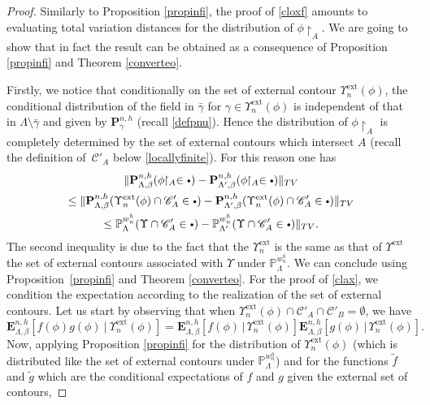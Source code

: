 \documentclass[10pt]{amsart}
\let\mathcal\mathscr
\newcommand{\sbullet}{{\scriptscriptstyle\bullet}}
\newcommand{\csbullet}{{\raisebox{1pt}{$\sbullet$}}}
\numberwithin{equation}{section}
\theoremstyle{plain}
\theoremstyle{definition}
\newcommand{\ext}{\mathrm{ext}}
\newcommand{\restrict}{\!\!\upharpoonright}
\newcommand{\cC}{{\ensuremath{\mathcal C}} }
\newcommand{\bP}{{\ensuremath{\mathbf P}} }
\newcommand{\bE}{{\ensuremath{\mathbf E}} }
\newcommand{\bbP}{{\ensuremath{\mathbb P}} }
\newcommand{\gb}{\beta}
\newcommand{\gL}{\Lambda}
\begin{document}
\begin{proof}
Similarly to Proposition \ref{propinfi}, the proof of \eqref{cloxf} amounts to evaluating total variation distances for the distribution of $\phi\restrict_A$.
We are going to show that in fact the result can be obtained as a consequence of Proposition \ref{propinfi} and Theorem \ref{converteo}.

Firstly, we notice that conditionally on the set of external contour $\Upsilon^{\ext}_n(\phi)$,
the conditional distribution of the field in $\bar \gamma$ for $\gamma \in \Upsilon^{\ext}_n(\phi)$ is independent of that in $\gL\setminus \bar \gamma$
and given by $\bP_{\gamma}^{n,h}$ (recall \eqref{defpnu}).
Hence the distribution of $\phi\restrict_{A}$ is completely determined by the set of external contours which intersect $A$ (recall the definition of~$\cC'_A$ below
\eqref{locallyfinite}). For this reason one has
\begin{multline*}%
\| \bP^{n,h}_{\gL,\gb}(\phi\restrict_A\in\csbullet)- \bP^{n,h}_{\gL',\gb}(\phi\restrict_A\in\csbullet)\|_{TV}\\\le
\| \bP^{n,h}_{\gL,\gb}(\Upsilon^{\ext}_n(\phi) \cap \cC'_{A}\in\csbullet)- \bP^{n,h}_{\gL',\gb}(\Upsilon^{\ext}_n(\phi) \cap \cC'_{A}\in\csbullet)\|_{TV}\\
\le \bbP^{w^{h}_{n}}_{\gL}(\Upsilon \cap \cC'_{A}\in\csbullet)- \bbP^{w^{h}_{n}}_{\gL'}(\Upsilon \cap \cC'_{A}\in\csbullet)\|_{TV}.
\end{multline*}
The second inequality is due to the fact that the $\Upsilon^{\ext}_n$ is the same as that of $\Upsilon^{\ext}$
the set of external contours associated with $\Upsilon$ under $\bbP^{w^{h}_{n}}_{\gL}$.
We can conclude using Proposition~\ref{propinfi} and Theorem \ref{converteo}.
For the proof of \eqref{clax}, we condition the expectation according to the realization of the set of external contours.
Let us start by observing that when $\Upsilon^{\ext}_n(\phi)\cap \cC'_A \cap \cC'_B=\emptyset$, we have
\begin{equation}\label{troum}
\bE^{n,h}_{\gL,\gb}[f(\phi)g(\phi) \ | \ \Upsilon^{\ext}_n(\phi)]= \bE^{n,h}_{\gL,\gb}[f(\phi) \, | \, \Upsilon^{\ext}_n(\phi)] \bE^{n,h}_{\gL,\gb}[g(\phi) \, | \,
\Upsilon^{\ext}_n(\phi)].
\end{equation}
Now, applying Proposition \ref{propinfi} for the distribution of $\Upsilon^{\ext}_n(\phi)$ (which is distributed like the set of external contours under
$\bbP^{w^{h}_{n}}_{\gL}$) and for the functions $\tilde f$ and $\tilde g$ which are the conditional expectations of $f$ and $g$ given the external set of contours,

\end{proof}
\end{document}
